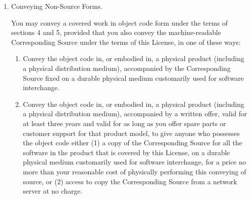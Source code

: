 \documentclass[10pt,a4paper,ngerman,titlepage,tocindentauto]{article}
\begin{document}
\begin{multicols}{3}
{\begin{enumerate}
\begin{enumerate}
					  \item If the work has interactive user interfaces, each must display
					  Appropriate Legal Notices; however, if the Program has interactive
					  interfaces that do not display Appropriate Legal Notices, your
					  work need not make them do so.
					\end{enumerate}
					A compilation of a covered work with other separate and independent
					works, which are not by their nature extensions of the covered work,
					and which are not combined with it such as to form a larger program,
					in or on a volume of a storage or distribution medium, is called an
					``aggregate'' if the compilation and its resulting copyright are not
					used to limit the access or legal rights of the compilation's users
					beyond what the individual works permit.  Inclusion of a covered work
					in an aggregate does not cause this License to apply to the other
					parts of the aggregate.

					\item Conveying Non-Source Forms.

					You may convey a covered work in object code form under the terms
					of sections 4 and 5, provided that you also convey the
					machine-readable Corresponding Source under the terms of this License,
					in one of these ways:
					  \begin{enumerate}
					  \item Convey the object code in, or embodied in, a physical product
					  (including a physical distribution medium), accompanied by the
					  Corresponding Source fixed on a durable physical medium
					  customarily used for software interchange.

					  \item Convey the object code in, or embodied in, a physical product
					  (including a physical distribution medium), accompanied by a
					  written offer, valid for at least three years and valid for as
					  long as you offer spare parts or customer support for that product
					  model, to give anyone who possesses the object code either (1) a
					  copy of the Corresponding Source for all the software in the
					  product that is covered by this License, on a durable physical
					  medium customarily used for software interchange, for a price no
					  more than your reasonable cost of physically performing this
					  conveying of source, or (2) access to copy the
					  Corresponding Source from a network server at no charge.


\end{enumerate}
\end{enumerate}}
\end{multicols}
\end{document}
